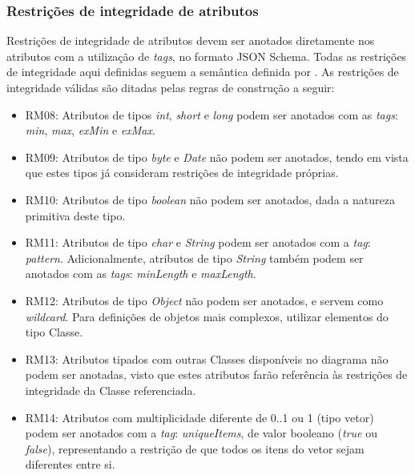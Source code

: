 \subsubsection{Restrições de integridade de atributos}

Restrições de integridade de atributos devem ser anotados diretamente nos atributos com a utilização de \textit{tags}, no formato JSON Schema. Todas as restrições de integridade aqui definidas seguem a semântica definida por \cite{PEZOA:2016}. As restrições de integridade válidas são ditadas pelas regras de construção a seguir:

\begin{itemize}
    \item RM08: Atributos de tipos \textit{int}, \textit{short} e \textit{long} podem ser anotados com as \textit{tags}: \textit{min}, \textit{max}, \textit{exMin} e \textit{exMax}.

    \item RM09: Atributos de tipo \textit{byte} e \textit{Date} não podem ser anotados, tendo em vista que estes tipos já consideram restrições de integridade próprias.

    \item RM10: Atributos de tipo \textit{boolean} não podem ser anotados, dada a natureza primitiva deste tipo.

    \item RM11: Atributos de tipo \textit{char} e \textit{String} podem ser anotados com a \textit{tag}: \textit{pattern}. Adicionalmente, atributos de tipo \textit{String} também podem ser anotados com as \textit{tags}: \textit{minLength} e \textit{maxLength}.

    \item RM12: Atributos de tipo \textit{Object} não podem ser anotados, e servem como \textit{wildcard}. Para definições de objetos mais complexos, utilizar elementos do tipo Classe.

    \item RM13: Atributos tipados com outras Classes disponíveis no diagrama não podem ser anotadas, visto que estes atributos farão referência às restrições de integridade da Classe referenciada.

    \item RM14: Atributos com multiplicidade diferente de 0..1 ou 1 (tipo vetor) podem ser anotados com a \textit{tag}: \textit{uniqueItems}, de valor booleano (\textit{true} ou \textit{false}), representando a restrição de que todos os itens do vetor sejam diferentes entre si.
\end{itemize}

